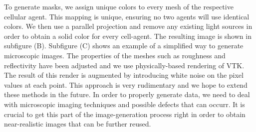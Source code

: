 \documentclass{article}
\begin{document}
To generate masks, we assign unique colors to every mesh of the respective cellular agent.
This mapping is unique, ensuring no two agents will use identical colors.
We then use a parallel projection and remove any existing light sources in order to obtain a solid
color for every cell-agent.
The resulting image is shown in subfigure (B).
Subfigure (C) shows an example of a simplified way to generate microscopic images.
The properties of the meshes such as roughness and reflectivity have been adjusted and we use
physically-based rendering of VTK.
The result of this render is augmented by introducing white noise on the pixel values at each point.
This approach is very rudimentary and we hope to extend these methods in the future.
In order to properly generate data, we need to deal with microscopic imaging techniques and possible
defects that can occurr.
It is crucial to get this part of the image-generation process right in order to obtain
near-realistic images that can be further reused.

%
\end{document}
